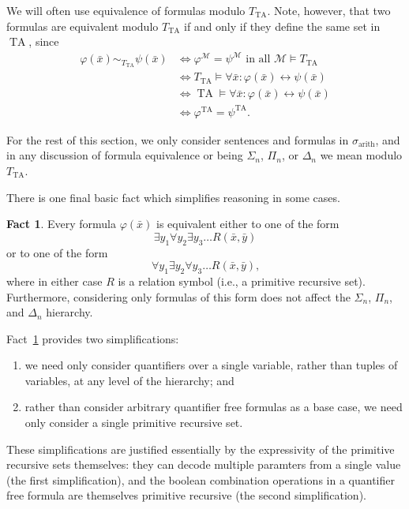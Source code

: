 \documentclass{article}
\theoremstyle{plain}
\theoremstyle{definition}
\newtheorem{fact}[thm]{Fact}
\newcommand{\arithsig}{\sigma_{\operatorname{arith}}}
\newcommand{\tuple}{\bar}
\DeclareMathOperator{\TA}{TA}
\newcommand{\tathy}{T_{\TA}}
\renewcommand{\phi}{\varphi}
\begin{document}
We will often use equivalence of formulas modulo $\tathy$. Note,
however, that two formulas are equivalent modulo $\tathy$ if and only
if they define the same set in $\TA$, since
\begin{align*}
  \phi(\tuple{x}) \sim_{\tathy} \psi(\tuple{x})
  &\iff \phi^\mathcal{M} = \psi^\mathcal{M} \text{ in all } \mathcal{M} \models \tathy \\
  &\iff \tathy \models \forall \tuple{x}: \phi(\tuple{x}) \leftrightarrow \psi(\tuple{x}) \\
  &\iff \TA \models \forall \tuple{x}: \phi(\tuple{x}) \leftrightarrow \psi(\tuple{x}) \\
  &\iff \phi^{\TA} = \psi^{\TA} \text{.}
\end{align*}

For the rest of this section, we only consider sentences and formulas
in $\arithsig$, and in any discussion of formula equivalence or being
$\Sigma_n$, $\Pi_n$, or $\Delta_n$ we mean modulo $\tathy$.

There is one final basic fact which simplifies reasoning in some
cases.

\begin{fact}\label{fact:arith-simpler-normalform}
  Every formula $\phi(\tuple{x})$ is equivalent either to one of the
  form
  $$\exists y_1 \forall y_2 \exists y_3 \ldots R(\tuple{x},\tuple{y})$$
  or to one of the form
  $$\forall y_1 \exists y_2 \forall y_3 \ldots R(\tuple{x},\tuple{y})\text{,}$$
  where in either case $R$ is a relation symbol (i.e., a primitive
  recursive set). Furthermore, considering only formulas of this form
  does not affect the $\Sigma_n$, $\Pi_n$, and $\Delta_n$ hierarchy.
\end{fact}

Fact~\ref{fact:arith-simpler-normalform} provides two simplifications:
\begin{enumerate}
\item we need only consider quantifiers over a single variable, rather
  than tuples of variables, at any level of the hierarchy; and
\item rather than consider arbitrary quantifier free formulas as a
  base case, we need only consider a single primitive recursive set.
\end{enumerate}
These simplifications are justified essentially by the expressivity of
the primitive recursive sets themselves: they can decode multiple
paramters from a single value (the first simplification), and the
boolean combination operations in a quantifier free formula are
themselves primitive recursive (the second simplification).
\end{document}
